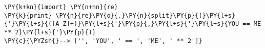 \begin{Verbatim}[commandchars=\\\{\}]
\PY{k+kn}{import} \PY{n+nn}{re}
\PY{k}{print} \PY{n}{re}\PY{o}{.}\PY{n}{split}\PY{p}{(}\PY{l+s}{'}\PY{l+s}{([A-Z]+)}\PY{l+s}{'}\PY{p}{,}\PY{l+s}{'}\PY{l+s}{YOU == ME ** 2}\PY{l+s}{'}\PY{p}{)}
\PY{c}{\PYZsh{}--> ['', 'YOU', ' == ', 'ME', ' ** 2']}
\end{Verbatim}

